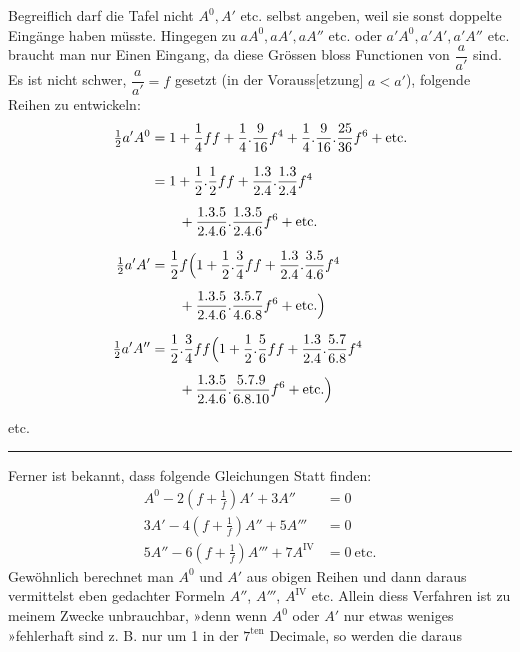 \par\indent Begreiflich darf die Tafel nicht $A^0,A'$ etc. selbst angeben, weil sie sonst doppelte Eingänge haben müsste. Hingegen zu $aA^0,aA',aA''$ etc. oder $a'A^0,a'A',a'A''$ etc. braucht man nur Einen Eingang, da diese Grössen bloss Functionen von $\dfrac a{a'}$ sind. Es ist nicht schwer, $\dfrac a{a'}=f$ gesetzt (in der Vorauss[etzung] $a<a'$), folgende Reihen zu entwickeln:
\[
\begin{aligned}
\tfrac12 a'A^0&=1+\frac14ff+\frac14.\frac9{16}f^4+\frac14.\frac9{16}.\frac{25}{36}f^6+\text{etc.}\\[.7em]
&=1+\frac12.\frac12ff+\frac{1.3}{2.4}.\frac{1.3}{2.4}f^4\\[.5em]
&\qquad{}+\frac{1.3.5}{2.4.6}.\frac{1.3.5}{2.4.6}f^6+\text{etc.}\\[.7em]
\tfrac12 a'A'&=\frac12 f\Bigl(1+\frac12.\frac34ff+\frac{1.3}{2.4}.\frac{3.5}{4.6}f^4\\[.5em]
&\qquad{}+\frac{1.3.5}{2.4.6}.\frac{3.5.7}{4.6.8}f^6+\text{etc.}\Bigr)\\[.7em]
\tfrac12 a'A''&=\frac12.\frac34ff\Bigl(1+\frac12.\frac56ff+\frac{1.3}{2.4}.\frac{5.7}{6.8}f^4\\[.5em]
&\qquad{}+\frac{1.3.5}{2.4.6}.\frac{5.7.9}{6.8.10}f^6+\text{etc.}\Bigr)
\end{aligned}
\]
\centerline{etc.}
\par\vfill\noindent\rule{.25\linewidth}{.4pt}\par\smallskip
\begingroup\footnotesize{}\par\endgroup
\clearpage
{}
\noindent Ferner ist bekannt, dass folgende Gleichungen Statt finden:
\[
\begin{aligned}
A^0-2\left(f+\frac1f\right)A'+3A''&=0\\[.6em]
3A'-4\left(f+\frac1f\right)A''+5A'''&=0\\[.6em]
5A''-6\left(f+\frac1f\right)A'''+7A^{\mathrm{IV}}&=0\ \text{etc.}
\end{aligned}
\]
\noindent Gewöhnlich berechnet man $A^0$ und $A'$ aus obigen Reihen und dann daraus vermittelst eben gedachter Formeln $A''$, $A'''$, $A^{\mathrm{IV}}$ etc. Allein diess Verfahren ist zu meinem Zwecke unbrauchbar, »denn wenn $A^0$ oder $A'$ nur etwas weniges\newline
»fehlerhaft sind z. B. nur um 1 in der $7^{\mathrm{ten}}$ Decimale, so werden die daraus\newline
